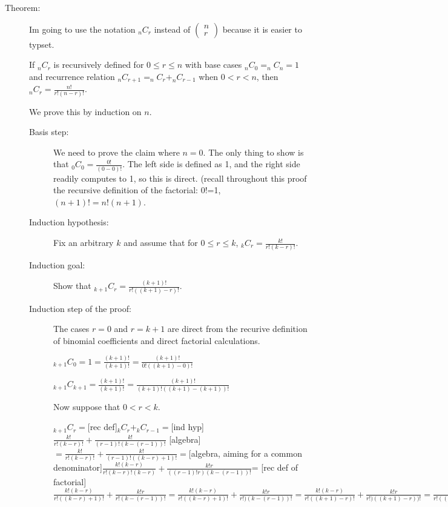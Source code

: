 \documentclass[12pt]{article}
\begin{document}
\begin{description}

\item[Theorem:]  Im going to use the notation $_nC_r$ instead of $\left(\begin{array}{c} n \\ r \end{array}\right)$ because it is easier to typset.

If $_nC_r$ is recursively defined for $0 \leq r \leq n$ with base cases $_nC_0 = _nC_n = 1$ and recurrence relation
$_nC_{r+1} = _nC_r + _nC_{r-1}$ when $0<r<n$, then $_nC_r = \frac{n!}{r!(n-r)!}$.

We prove this by induction on $n$.

\begin{description}
\item[Basis step:]  We need to prove the claim where $n=0$.  The only thing to show is that $_0C_0 = \frac{0!}
{(0-0)!}$.  The left side is defined as 1, and the right side readily computes to 1, so this is direct.  (recall throughout this proof the recursive definition of the factorial:  0!=1, $(n+1)! = n!(n+1)$.

\item[Induction hypothesis:]  Fix an arbitrary $k$ and assume that for $0 \leq r \leq k$, $_kC_r = \frac{k!}{r!(k-r)!}$.

\item[Induction goal:]  Show that $_{k+1}C_r = \frac{(k+1)!}{r!((k+1)-r)!}$.

\item[Induction step of the proof:]  The cases $r=0$ and $r=k+1$ are direct from the recurive definition of binomial coefficients and direct factorial calculations.

$_{k+1}C_0 = 1 = \frac{(k+1)!}{(k+1)!}=\frac{(k+1)!}{0!((k+1)-0)!}$

$_{k+1}C_{k+1}= \frac{(k+1)!}{(k+1)!}= \frac{(k+1)!}{(k+1)!((k+1)-(k+1))!}$

Now suppose that $0<r<k$.

$_{k+1}C_r = $[rec def]$_kC_r + _kC_{r-1}=$[ind hyp] $ \frac{k!}{r!(k-r)!} + \frac{k!}{(r-1)!(k-(r-1))!}$ [algebra] $ = \frac{k!}{r!(k-r)!} + \frac{k!}{(r-1)!((k-r)+1)!} =$[algebra, aiming for a common denominator]$  \frac{k!(k-r)}{r!(k-r)!(k-r)} + \frac{k!r}{((r-1)!r)(k-(r-1))!}$\newline = [rec def of factorial]$  \frac{k!(k-r)}{r!((k-r)+1)!} + \frac{k!r}{r!(k-(r-1))!}=\frac{k!(k-r)}{r!((k-r)+1)!} + \frac{k!r}{r!)(k-(r-1))!}= \frac{k!(k-r)}{r!((k+1)-r)!} + \frac{k!r}{r!)((k+1)-r))!}=\frac{k!k} {r!((k+1)-r)!}=\frac{(k+1)!} {r!((k+1)-r)!}$


\end{description}
\end{description}
\end{document}
